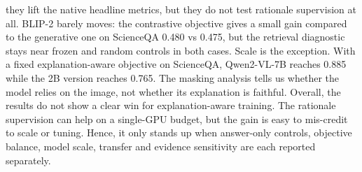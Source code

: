 they lift the native headline metrics, but they do not test rationale supervision at all.
BLIP-2 barely moves: the contrastive objective gives a small gain compared to the generative one on ScienceQA 0.480 vs 0.475,
but the retrieval diagnostic stays near frozen and random controls in both cases.
Scale is the exception. With a fixed explanation-aware objective on ScienceQA, Qwen2-VL-7B reaches 0.885 while the 2B version reaches 0.765.
The masking analysis tells us whether the model relies on the image, not whether its explanation is faithful.
Overall, the results do not show a clear win for explanation-aware training.
The rationale supervision can help on a single-GPU budget, but the gain is easy to mis-credit to scale or tuning.
Hence, it only stands up when answer-only controls, objective balance, model scale, transfer and evidence sensitivity are each reported separately.

    \clearpage
